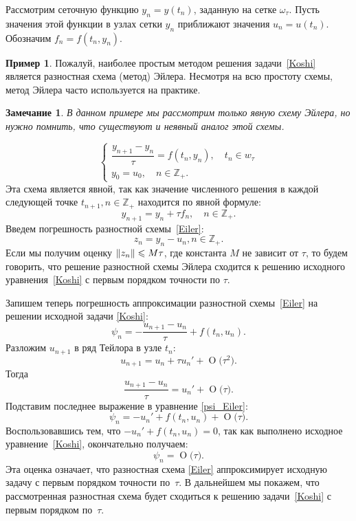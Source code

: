 \documentclass[11pt,a4paper,twoside,listtotoc,bibtotoc]{report}
\numberwithin{equation}{section}
\theoremstyle{definition}
\newtheorem{example}{Пример}[section]
\theoremstyle{plain}
\newtheorem*{note*}{Замечание}
\DeclarePairedDelimiter\norm{\lVert}{\rVert}
\newcommand{\bigO}[1]{\ensuremath{\operatorname{O}\bigl(#1\bigr)}}
\begin{document}
Рассмотрим сеточную функцию $y_n = y(t_n)$, заданную
на сетке $\omega_\tau$. Пусть значения этой функции в узлах сетки $y_n$ приближают
значения $u_n=u(t_n)$. Обозначим $f_n=f(t_n,y_n)$.
\fi
%
\begin{example}
    Пожалуй, наиболее простым методом решения задачи~\eqref{Koshi} является
    разностная схема (метод) Эйлера. Несмотря на всю простоту схемы, метод Эйлера часто
    используется на практике.
    \begin{note*}
        В данном примере мы рассмотрим только явную схему Эйлера, но нужно
        помнить, что существуют и неявный аналог этой схемы.
    \end{note*}
    \begin{equation}
        \label{Eiler}
        \begin{cases}
            \dfrac{y_{n+1} - y_n}{\tau} = f(t_n, y_n), \quad t_n \in w_{\tau} \\
            y_0 = u_0, \quad n \in \mathbb{Z}_+.
        \end{cases}
    \end{equation}
    Эта схема является явной, так как значение численного решения в каждой
    следующей точке $t_{n+1}, n\in\mathbb{Z}_+$ находится по явной формуле:
    $$
        y_{n+1} = y_n + \tau f_n, \quad n \in \mathbb{Z}_+.
    $$
    Введем погрешность разностной схемы~\eqref{Eiler}:
    $$
        z_n = y_n - u_n,   n\in\mathbb{Z}_+.
    $$
    Если мы получим оценку $\norm{z_n} \leqslant M\tau$, где константа $M$ не зависит от $\tau$,
    то будем говорить, что решение разностной схемы Эйлера сходится к решению исходного
    уравнения~\eqref{Koshi} с первым порядком точности по $\tau$.

    Запишем теперь погрешность аппроксимации разностной схемы~\eqref{Eiler} на решении исходной
    задачи \eqref{Koshi}:
    \begin{equation}
        \label{psi_Eiler}
        \psi_n = - \frac{u_{n+1} - u_n}{\tau} + f(t_n, u_n).
    \end{equation}
    Разложим $u_{n+1}$ в ряд Тейлора в узле $t_n$:
    $$
        u_{n+1} = u_n + \tau u_n' + \bigO{\tau^2}.
    $$
    Тогда
    $$
        \frac{u_{n+1} - u_n}{\tau} = u_n' + \bigO{\tau}.
    $$
    Подставим последнее выражение в уравнение \eqref{psi_Eiler}:
    $$
        \psi_n = -u_n' + f(t_n, u_n) + \bigO{\tau}.
    $$
    Воспользовавшись тем, что $-u_n' + f(t_n, u_n) = 0$, так как выполнено
    исходное уравнение~\eqref{Koshi}, окончательно получаем:
    $$
        \psi_n = \bigO{\tau}.
    $$
    Эта оценка означает, что разностная схема \eqref{Eiler} аппроксимирует исходную задачу с первым порядком точности по~$\tau$. В дальнейшем мы покажем, что
    рассмотренная разностная схема будет сходиться к решению задачи~\eqref{Koshi}
    с первым порядком по~$\tau$.
\end{example}
\end{document}
